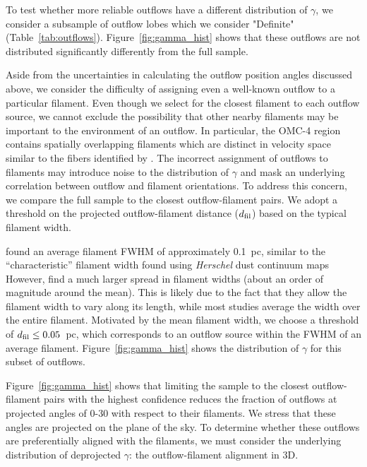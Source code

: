 \documentclass[twocolumn]{aastex63}
\begin{document}
To test whether more reliable outflows have a different distribution of $\gamma$, we consider a subsample of outflow lobes which we consider "Definite" (Table~\ref{tab:outflows}). Figure~\ref{fig:gamma_hist} shows that these outflows are not distributed significantly differently from the full sample.

Aside from the uncertainties in calculating the outflow position angles discussed above, we consider the difficulty of assigning even a well-known outflow to a particular filament. Even though we select for the closest filament to each outflow source, we cannot exclude the possibility that other nearby filaments may be important to the environment of an outflow. In particular, the OMC-4 region contains spatially overlapping filaments which are distinct in velocity space \citep{Suri19} similar to the fibers identified by \citet{Hacar13}. The incorrect assignment of outflows to filaments may introduce noise to the distribution of $\gamma$ and mask an underlying correlation between outflow and filament orientations. To address this concern, we compare the full sample to the closest outflow-filament pairs. We adopt a threshold on the projected outflow-filament distance ($d_{\rm fil}$) based on the typical filament width.

\citet{Suri19} found an average filament FWHM of approximately 0.1~pc, similar to the ``characteristic'' filament width found using \emph{Herschel} dust continuum maps \citep[e.g.][]{Arzoumanian11,Koch15} However, \citet{Suri19} find a much larger spread in filament widths (about an order of magnitude around the mean). This is likely due to the fact that they allow the filament width to vary along its length, while most studies average the width over the entire filament. Motivated by the mean filament width, we choose a threshold of $d_{\rm fil} \leq 0.05$~pc, which corresponds to an outflow source within the FWHM of an average filament. Figure~\ref{fig:gamma_hist} shows the distribution of $\gamma$ for this subset of outflows.

Figure~\ref{fig:gamma_hist} shows that limiting the sample to the closest outflow-filament pairs with the highest confidence reduces the fraction of outflows at projected angles of 0-30\degr{} with respect to their filaments. We stress that these angles are projected on the plane of the sky. To determine whether these outflows are preferentially aligned with the filaments, we must consider the underlying distribution of deprojected $\gamma$: the outflow-filament alignment in 3D.
\end{document}
